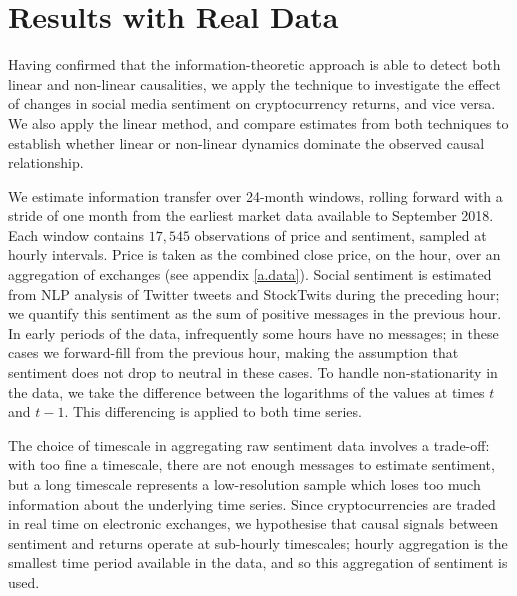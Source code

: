 \documentclass[]{rsos}%
\begin{document}


\section{Results with Real Data} \label{s.results}
  Having confirmed that the information-theoretic approach is able to detect both linear and non-linear causalities, we apply the technique to investigate the effect of {\color{blue} changes in} social media sentiment on cryptocurrency {\color{blue} returns, and vice versa}. We also apply the linear method, and compare estimates from both techniques to establish whether linear or non-linear dynamics dominate the observed causal relationship.

  We estimate information transfer over 24-month windows, rolling forward with a stride of one month from the earliest market data available to September 2018. Each window contains $17,545$ observations of price and sentiment, sampled at hourly intervals. Price is taken as the combined close price, on the hour, over an aggregation of exchanges (see appendix \ref{a.data}). Social sentiment is estimated from NLP analysis of Twitter tweets and StockTwits during the preceding hour; we quantify this sentiment as the sum of positive messages in the previous hour. In early periods of the data, infrequently some hours have no messages; in these cases we forward-fill from the previous hour, making the assumption that sentiment does not drop to neutral in these cases. To handle non-stationarity in the data, we take the difference between the logarithms of the values at times $t$ and $t-1$. This differencing is applied to both time series. 

  The choice of timescale in aggregating raw sentiment data involves a trade-off: with too fine a timescale, there are not enough messages to estimate sentiment, but a long timescale represents a low-resolution sample which loses too much information about the underlying time series. Since cryptocurrencies are traded in real time on electronic exchanges, we hypothesise that causal signals between sentiment and {\color{blue} returns} operate at sub-hourly timescales; hourly aggregation is the smallest time period available in the data, and so this aggregation of sentiment is used. 
\end{document}
